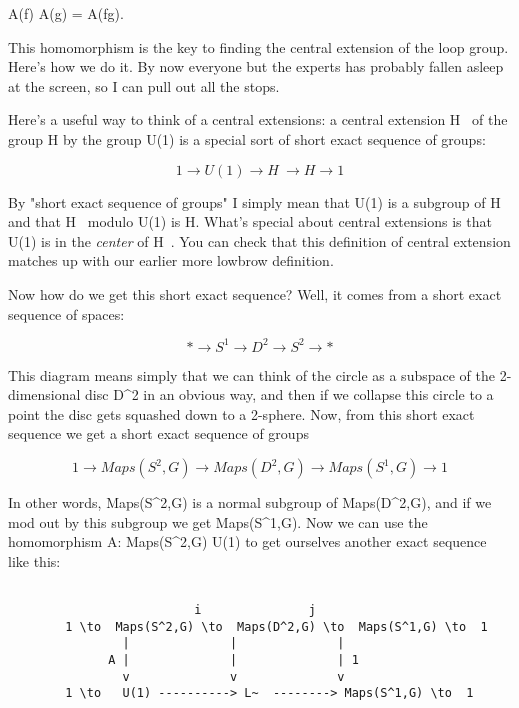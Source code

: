 A(f) A(g) = A(fg).

This homomorphism is the key to finding the central extension of the
loop group.  Here's how we do it.  By now everyone but the experts has
probably fallen asleep at the screen, so I can pull out all the stops.

Here's a useful way to think of a central extensions: a central
extension H~ of the group H by the group U(1) is a special sort of short
exact sequence of groups:


$$

                 1 \to  U(1) \to  H~ \to  H \to  1

$$
    
By "short exact sequence of groups" I simply mean that U(1) is a
subgroup of H~ and that H~ modulo U(1) is H.  What's special about
central extensions is that U(1) is in the \emph{center} of H~.  You can check
that this definition of central extension matches up with our earlier
more lowbrow definition.

Now how do we get this short exact sequence?  Well, it comes from
a short exact sequence of spaces:


$$

                 * \to  S^1 \to  D^2 \to  S^2 \to  *

$$
    
This diagram means simply that we can think of the circle as a subspace
of the 2-dimensional disc D^2 in an obvious way, and then if we collapse
this circle to a point the disc gets squashed down to a 2-sphere.  Now,
from this short exact sequence we get a short exact sequence of groups


$$

        1 \to  Maps(S^2,G) \to  Maps(D^2,G) \to  Maps(S^1,G) \to  1

$$
    
In other words, Maps(S^2,G) is a normal subgroup of Maps(D^2,G), and if
we mod out by this subgroup we get Maps(S^1,G).  Now we can use the
homomorphism A: Maps(S^2,G) \to  U(1) to get ourselves another exact
sequence like this:


\begin{verbatim}

                          i               j
        1 \to  Maps(S^2,G) \to  Maps(D^2,G) \to  Maps(S^1,G) \to  1
                |              |              |
              A |              |              | 1
                v              v              v
        1 \to   U(1) ----------> L~  --------> Maps(S^1,G) \to  1


\end{verbatim}
    
